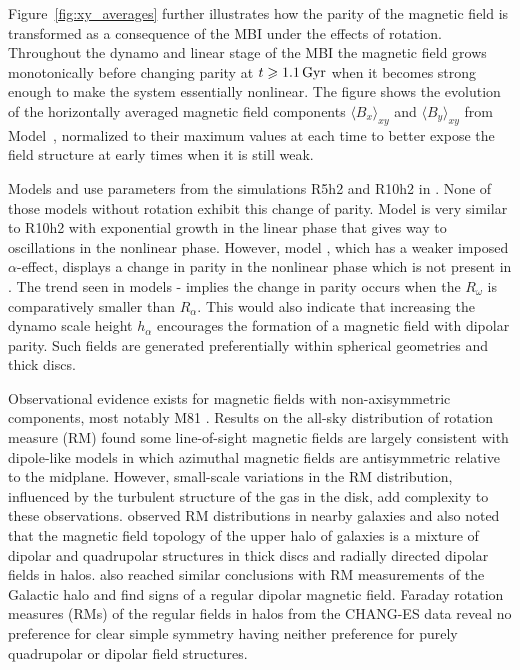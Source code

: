 \documentclass[fleqn,usenatbib]{mnras}
\newcommand{\RVOASA}{{\sf{O25}}}
\newcommand{\RSOBSA}{{\sf{O60}}}
\newcommand{\RSOBSD}{{\sf{O60q0.3}}}
\newcommand{\RSOBSE}{{\sf{O60q0.1}}}
\newcommand{\RXOASA}{{\sf{H25}}}
\newcommand{\Gyr}{\,{\rm Gyr}}  %
\begin{document}
Figure~\ref{fig:xy_averages} further illustrates how the parity of the magnetic
field is transformed as a consequence of the MBI under the effects of rotation.
Throughout the dynamo and linear stage of the MBI the magnetic field grows
monotonically before changing parity at $t\geq 1.1\Gyr$ when it becomes strong
enough to make the system essentially nonlinear. The figure shows the evolution
of the horizontally averaged magnetic field components $\langle
B_x\rangle_{xy}$ and $\langle B_y\rangle_{xy}$ from Model~\RSOBSD, normalized
to their maximum values at each time to better expose the field structure at
early times when it is still weak.

Models {\RVOASA} and {\RXOASA} use parameters from the simulations R5h2 and
R10h2 in \citet{QSTGB23}. None of those models without rotation exhibit this
change of parity. Model {\RXOASA} is very similar to R10h2 with exponential
growth in the linear phase that gives way to oscillations in the nonlinear
phase. However, model {\RVOASA}, which has a weaker imposed $\alpha$-effect,
displays a change in parity in the nonlinear phase which is not present in
{\RXOASA}. The trend seen in models {\RSOBSA}-{\RSOBSE} implies the change in
parity occurs when the $R_\omega$ is comparatively smaller than $R_\alpha$.
{This would also indicate that increasing the} dynamo scale height
$h_{\alpha}$ encourages the formation of a magnetic field with dipolar parity.
{Such fields} are generated preferentially within spherical geometries and
thick discs.

Observational evidence {exists} for magnetic fields with non-axisymmetric
components, most notably M81 \citep{KBH1989,SSK1992}.  Results on the all-sky
distribution of rotation measure (RM) {\citep{TSS2009} found some}
line-of-sight magnetic fields are largely consistent with dipole-like models in
which azimuthal magnetic fields are antisymmetric relative to the midplane.
However, small-scale variations in the RM distribution, influenced by the
turbulent structure of the gas in the disk, add complexity to these
observations. \citet{BHB2010} observed RM distributions in nearby galaxies and
also noted that the magnetic field topology of the upper halo of galaxies is a
mixture of dipolar and quadrupolar structures in thick discs and radially
directed dipolar fields in halos. \citet{XH2024} also reached similar
conclusions with RM measurements of the Galactic halo and find signs of a
regular dipolar magnetic field.  Faraday rotation measures (RMs) of the regular
fields in halos from the CHANG-ES data \citep{CHANG-ES2024} reveal no
preference for clear simple symmetry having neither preference for purely
quadrupolar or dipolar field structures.
\end{document}
